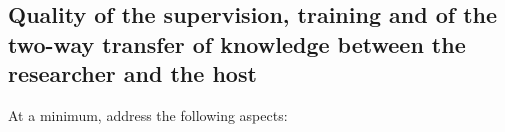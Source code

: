 \documentclass[12pt,draftproposal]{msca-pf}
\begin{document}




\subsection{Quality of the supervision, training and of the two-way transfer of
    knowledge between the researcher and the host}
\label{ssc:excellence:supervision}

At a minimum, address the following aspects:
\end{document}
